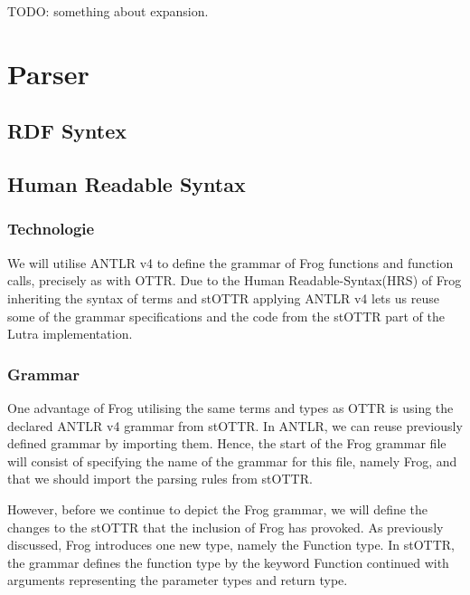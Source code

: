 \para
TODO: something about expansion. 

\section{Parser}
\label{parser}
\subsection{RDF Syntex}
\label{implRDF}

\subsection{Human Readable Syntax}
\label{implHRS}
\subsubsection{Technologie}
We will utilise ANTLR v4 to define the grammar of Frog functions and function calls, precisely as with OTTR.  Due to the Human Readable-Syntax(HRS) of Frog inheriting the syntax of terms and stOTTR applying ANTLR v4 lets us reuse some of the grammar specifications and the code from the stOTTR part of the Lutra implementation. 

\subsubsection{Grammar}
One advantage of Frog utilising the same terms and types as OTTR is using the declared ANTLR v4 grammar from stOTTR. In ANTLR, we can reuse previously defined grammar by importing them. Hence, the start of the Frog grammar file will consist of specifying the name of the grammar for this file, namely Frog, and that we should import the parsing rules from stOTTR. 

\para



\para
However, before we continue to depict the Frog grammar, we will define the changes to the stOTTR that the inclusion of Frog has provoked. As previously discussed, Frog introduces one new type, namely the Function type. In stOTTR, the grammar defines the function type by the keyword Function continued with arguments representing the parameter types and return type.

\para


